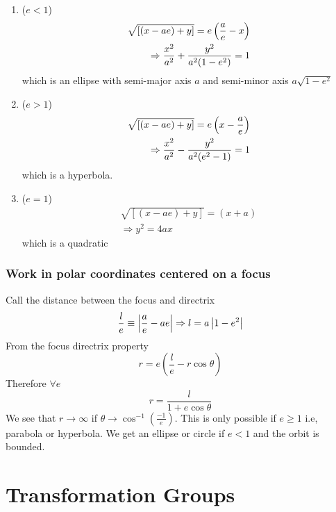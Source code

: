 \documentclass{article}
\numberwithin{equation}{section}
\begin{document}
\begin{enumerate}[cases]
    \item ($e < 1$)
    \begin{align*}
        \sqrt{[(x - ae) + y]} = e \left( \frac{a}{e} - x \right) \\
        \Rightarrow \frac{x^2}{a^2} + \frac{y^2}{a^2(1 - e^2)} = 1
    \end{align*}
    which is an ellipse with semi-major axis $a$ and semi-minor axis $a \sqrt{1 - e^2}$
    \item ($e > 1$) 
    \begin{align*}
        \sqrt{[(x - ae) + y]} = e \left( x - \frac{a}{e} \right) \\
        \Rightarrow \frac{x^2}{a^2} - \frac{y^2}{a^2(e^2 - 1)} = 1
    \end{align*}
    which is a hyperbola.
    \item ($e = 1$) 
    \begin{align*}
        \sqrt{[(x - ae) + y]} = (x + a) \\
        \Rightarrow y^2 = 4ax
    \end{align*}
    which is a quadratic
\end{enumerate}

\subsubsection*{Work in polar coordinates centered on a focus}
Call the distance between the focus and directrix
\[
    \frac{l}{e} \equiv \left\lvert \frac{a}{e} - ae\right\rvert \Rightarrow l = a\left\lvert 1 - e^2\right\rvert  
\]
From the focus directrix property
\[
    r = e(\frac{l}{e} - r \cos \theta)
\]
Therefore $\forall e$
\begin{equation}\label{eq:6-6}
    r = \frac{l}{1 + e \cos \theta}
\end{equation}
We see that $r \rightarrow \infty$ if $\theta \rightarrow \cos^{-1}(\frac{-1}{e})$.
This is only possible if $e \geq 1$ i.e, parabola or hyperbola.
We get an ellipse or circle if $e < 1$ and the orbit is bounded. 


\section{Transformation Groups}
\end{document}
